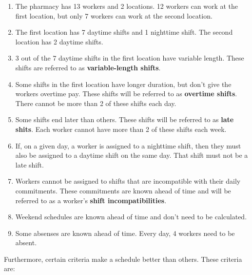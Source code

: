\documentclass[conference]{IEEEtran}
\begin{document}
\begin{enumerate}[start]
    \item {
        \label{constraint:domain}
        The pharmacy has 13 workers and 2 locations. 12 workers can work at the first location, but only 7 workers can work at the second location.
    }
    \item {
        \label{constraint:shifts}
        The first location has 7 daytime shifts and 1 nighttime shift. The second location has 2 daytime shifts.
    }
    \item {
        \label{constraint:variable-length-shifts}
        3 out of the 7 daytime shifts in the first location have variable length. These shifts are referred to as \textbf{variable-length shifts}.
    }
    \item {
        \label{constraint:overtime-shifts}
        Some shifts in the first location have longer duration, but don't give the workers overtime pay. These shifts will be referred to as \textbf{overtime shifts}. There cannot be more than 2 of these shifts each day.
    }
    \item {
        \label{constraint:late-shifts}
        Some shifts end later than others. These shifts will be referred to as \textbf{late shits}. Each worker cannot have more than 2 of these shifts each week.
    }
    \item {
        \label{constraint:nighttime-shift-implies-daytime-shift}
        If, on a given day, a worker is assigned to a nighttime shift, then they must also be assigned to a daytime shift on the same day. That shift must not be a late shift.
    }
    \item {
        \label{constraint:shift-incompatibilities}
        Workers cannot be assigned to shifts that are incompatible with their daily commitments. These commitments are known ahead of time and will be referred to as a worker's \textbf{shift incompatibilities}.
    }
    \item {
        \label{constraint:weekend-schedules-known-ahead-of-time}
        Weekend schedules are known ahead of time and don't need to be calculated.
    }
    \item {
        \label{constraint:absenses-known-ahead-of-time}
        Some absenses are known ahead of time. Every day, 4 workers need to be absent.
    }
\end{enumerate}

Furthermore, certain criteria make a schedule better than others. These criteria are:
\end{document}
